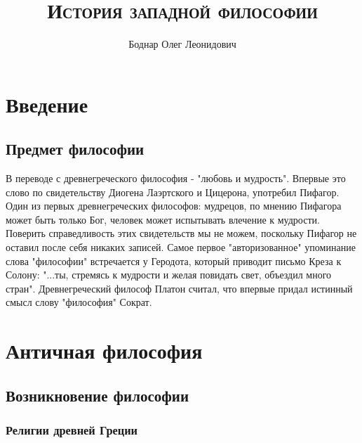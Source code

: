 
\setmainfont{Times New Roman}
\title{\textbf{\textsc{История западной философии}}}
\author{Боднар Олег Леонидович}
\date{} %
\linespread{1.3} %


	
    \maketitle %
	\thispagestyle{empty} %
	\clearpage %
	\setcounter{page}{1} %
		
	\tableofcontents
	\clearpage
	\section{Введение}
	\subsection{Предмет философии}
	
	\par В переводе с древнегреческого философия - "любовь и мудрость". Впервые это слово 
	по свидетельству Диогена Лаэртского и Цицерона, употребил Пифагор. Один из первых 
	древнегреческих философов: мудрецов, по мнению Пифагора может быть только Бог, человек 
	может испытывать влечение к мудрости. Поверить справедливость этих свидетельств мы не 
	можем, поскольку Пифагор не оставил после себя никаких записей.  Самое первое 
	"авторизованное" упоминание слова "философии" встречается у Геродота, который приводит 
	письмо Креза к Солону: "...ты, стремясь к мудрости и желая повидать свет, объездил 
	много стран". Древнегреческий философ Платон считал, что впервые придал истинный 
	смысл слову "философия" Сократ. 
	\clearpage
	
	\section{Античная философия}
	
	\subsection{Возникновение философии}
    \subsubsection{Религии древней Греции}	
    
